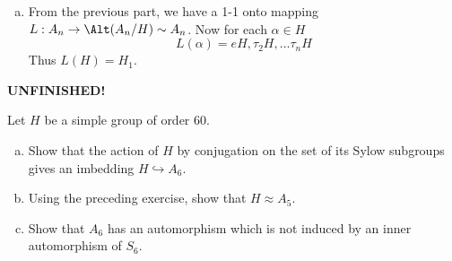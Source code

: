 \documentclass[12pt]{book}
\newcommand{\UNFINISHED}{\large\textbf{UNFINISHED!}}
\newcounter{myenumi}
\newenvironment{myenumerate}
{\begin{enumerate}
 \setcounter{enumi}{\themyenumi}
}
{\setcounter{myenumi}{\theenumi}
 \end{enumerate}}
\begin{document}
\begin{myenumerate}
\begin{enumerate}[(a)]
\item
From the previous part, we have a 1-1 onto mapping
 \(L: A_n \to \Alt(A_n/H)\sim A_n\).
Now for each \(\alpha \in H\)
\begin{equation*}
 L(\alpha) = eH, \tau_2 H, \ldots \tau_n H
\end{equation*}
Thus \(L(H) = H_1\).
\end{enumerate}

\UNFINISHED

\begin{excopy}
Let $H$ be a simple group of order \(60\).
\begin{enumerate}[(a)]
\item
Show that the action of $H$ by conjugation on the set of its Sylow subgroups
gives an imbedding \(H \hookrightarrow A_6\).
\item
Using the preceding exercise, show that \(H \approx A_5\).
\item
Show that \(A_6\) has an automorphism which is not induced by an inner
automorphism of \(S_6\).
\end{enumerate}
\end{excopy}

\begin{excopy}
\end{excopy}

\begin{excopy}
\end{excopy}

\end{myenumerate}




% 
\printindex

\end{document}
